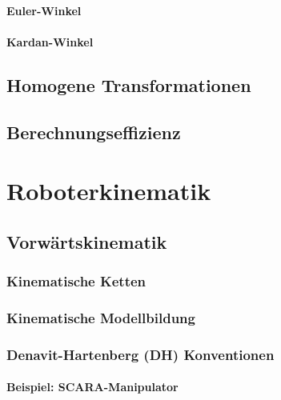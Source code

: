 \documentclass[a4paper, 11pt, accentcolor = tud3b]{tudreport}
\begin{document}
				\subsubsection{Euler-Winkel} %

				\subsubsection{Kardan-Winkel} %

		\section{Homogene Transformationen} %

		\section{Berechnungseffizienz} %

	\chapter{Roboterkinematik} %

		\section{Vorwärtskinematik} %

			\subsection{Kinematische Ketten} %

			\subsection{Kinematische Modellbildung} %

			\subsection{Denavit-Hartenberg (DH) Konventionen} %

				\subsubsection{Beispiel: SCARA-Manipulator} %
\end{document}

